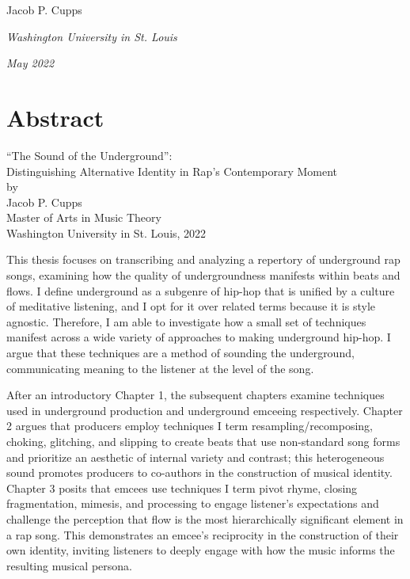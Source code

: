 \documentclass[12pt]{report}
\begin{document}
\vspace{0.2cm}
\hfill{Jacob P. Cupps}

\noindent \textit{Washington University in St. Louis}

\noindent \textit{May 2022}

    \chapter*{Abstract}
    
    \begin{center}
        \large ``The Sound of the Underground'': \\
        \large Distinguishing Alternative Identity in Rap's Contemporary Moment  \\
        \normalsize by \\
        Jacob P. Cupps \\
        Master of Arts in Music Theory \\
        
        Washington University in St. Louis, 2022 \\
    \end{center}
    

    \normalsize
    This thesis focuses on transcribing and analyzing a repertory of underground rap songs, examining
    how the quality of undergroundness manifests within beats and flows. I define underground as a
    subgenre of hip-hop that is unified by a culture of meditative listening, and I opt for it over
    related terms because it is style agnostic. Therefore, I am able to investigate how a small set
    of techniques manifest across a wide variety of approaches to making underground hip-hop. I argue
    that these techniques are a method of sounding the underground, communicating meaning to the 
    listener at the level of the song.

    After an introductory Chapter 1, the subsequent chapters examine techniques used in underground
    production and underground emceeing respectively. Chapter 2 argues that producers employ techniques
    I term resampling/recomposing, choking, glitching, and slipping to create beats that use non-standard
    song forms and prioritize an aesthetic of internal variety and contrast; this heterogeneous sound
    promotes producers to co-authors in the construction of musical identity. Chapter 3 posits that emcees
    use techniques I term pivot rhyme, closing fragmentation, mimesis, and processing to engage listener's
    expectations and challenge the perception that flow is the most hierarchically significant element in a
    rap song. This demonstrates an emcee's reciprocity in the construction of their own identity, inviting
    listeners to deeply engage with how the music informs the resulting musical persona.
\end{document}
